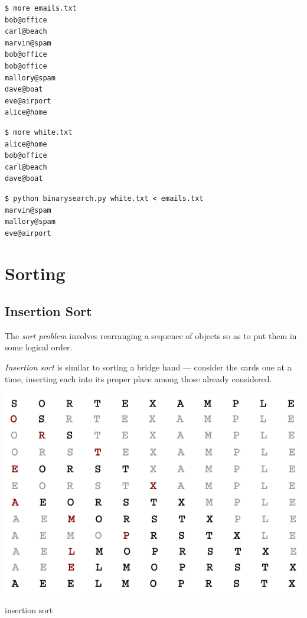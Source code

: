 \documentclass[8pt,a4paper,compress,handout]{beamer}
\begin{document}
\begin{frame}[fragile]
\begin{lstlisting}[language={}]
$ more emails.txt 
bob@office
carl@beach
marvin@spam
bob@office
bob@office
mallory@spam
dave@boat
eve@airport
alice@home
\end{lstlisting}

\begin{lstlisting}[language={}]
$ more white.txt
alice@home
bob@office
carl@beach
dave@boat
\end{lstlisting}

\begin{lstlisting}[language={}]
$ python binarysearch.py white.txt < emails.txt 
marvin@spam
mallory@spam
eve@airport
\end{lstlisting}
\end{frame}

\section{Sorting}
\subsection*{Insertion Sort}
\begin{frame}[fragile]
The \emph{sort problem} involves rearranging a sequence of objects so as to put them in some logical order.

\bigskip

\emph{Insertion sort} is similar to sorting a bridge hand --- consider the cards one at a time, inserting each into its proper place among those already considered.
\begin{center}
\includegraphics[scale=0.3]{figures/insertion.png}

\smallskip

\tiny insertion sort
\end{center}
\end{frame}
\end{document}
